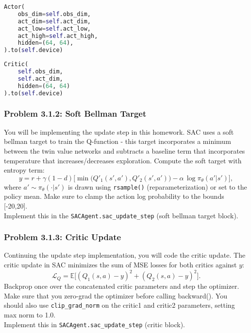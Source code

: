 \documentclass[12pt]{article}
\begin{document}
\begin{minipage}{0.45\linewidth}
\begin{lstlisting}[language=Python]
Actor(
    obs_dim=self.obs_dim,
    act_dim=self.act_dim,
    act_low=self.act_low,
    act_high=self.act_high,
    hidden=(64, 64),
).to(self.device)
\end{lstlisting}
\end{minipage}
\hfill
\begin{minipage}{0.45\linewidth}
\begin{lstlisting}[language=Python]
Critic(
    self.obs_dim,
    self.act_dim,
    hidden=(64, 64)
).to(self.device)
\end{lstlisting}
\end{minipage}

\subsubsection*{Problem 3.1.2: Soft Bellman Target}
You will be implementing the update step in this homework.
SAC uses a soft bellman target to train the Q-function - this target incorporates a minimum between the twin value networks and subtracts a baseline term that incorporates temperature that increases/decreases exploration.
Compute the soft target with entropy term:
\begin{equation}
\textstyle y = r + \gamma(1-d)\Big[\min\big(Q'_1(s', a'), Q'_2(s', a')\big) - \alpha\, \log \pi_\theta(a'|s')\Big],
\end{equation}
where \(a'\sim\pi_\theta(\cdot|s')\) is drawn using \texttt{rsample()} (reparameterization) or set to the policy mean. Make sure to clamp the action log probability to the bounds [-20,20]. \\Implement this in the \texttt{SACAgent.sac\_update\_step} (soft bellman target block). \\

\subsubsection*{Problem 3.1.3: Critic Update}
Continuing the update step implementation, you will code the critic update. The critic update in SAC minimizes the sum of MSE losses for both critics against \(y\):
\begin{equation}
\mathcal{L}_Q = \mathbb{E}\big[(Q_1(s,a)-y)^2 + (Q_2(s,a)-y)^2\big].
\end{equation}
Backprop once over the concatenated critic parameters and step the optimizer. Make sure that you zero-grad the optimizer before calling backward(). You should also use \texttt{clip_grad_norm} on the critic1 and critic2 parameters, setting max norm to 1.0.
\\ Implement this in \texttt{SACAgent.sac\_update\_step} (critic block).
\end{document}
